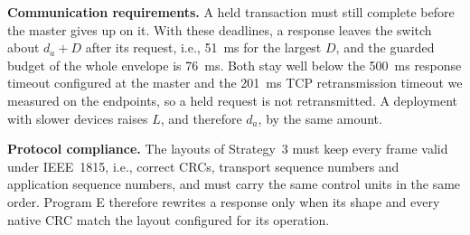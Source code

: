 \textbf{Communication requirements.} A held transaction must still complete before the master gives up on it. With these deadlines, a response leaves the switch about $d_a + D$ after its request, i.e., 51~ms for the largest $D$, and the guarded budget of the whole envelope is 76~ms. Both stay well below the 500~ms response timeout configured at the master and the 201~ms TCP retransmission timeout we measured on the endpoints, so a held request is not retransmitted. A deployment with slower devices raises $L$, and therefore $d_a$, by the same amount.

\textbf{Protocol compliance.} The layouts of Strategy~3 must keep every frame valid under IEEE~1815, i.e., correct CRCs, transport sequence numbers and application sequence numbers, and must carry the same control units in the same order. Program E therefore rewrites a response only when its shape and every native CRC match the layout configured for its operation.
